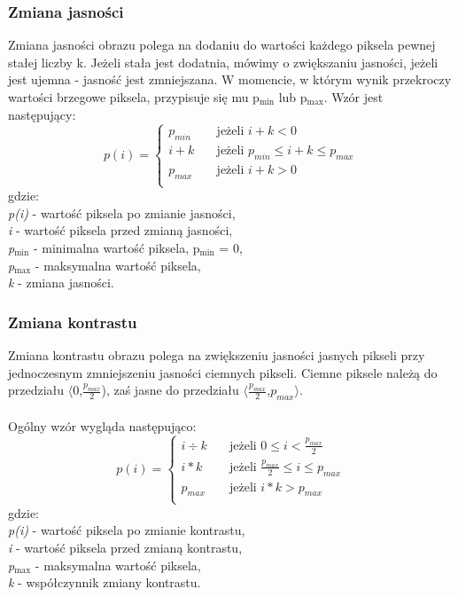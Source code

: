 \documentclass{classrep}
\begin{document}
\subsubsection{Zmiana jasności}
Zmiana jasności obrazu polega na dodaniu do wartości każdego piksela pewnej stałej liczby k. Jeżeli stała jest dodatnia, mówimy o zwiększaniu jasności, jeżeli jest ujemna - jasność jest zmniejszana. W momencie, w którym wynik przekroczy wartości brzegowe piksela, przypisuje się mu p$_{\text{min}}$ lub p$_{\text{max}}$. Wzór jest następujący:
\[ p(i) =
  \begin{cases}
    p_{min} & \quad \text{jeżeli } i + k < 0\\
    i + k  & \quad \text{jeżeli } p_{min} \leq i+k \leq p_{max}\\
    p_{max}  & \quad \text{jeżeli } i + k > 0\\
  \end{cases}
\]
gdzie:\\
\textit{p(i)} - wartość piksela po zmianie jasności,\\
\textit{i} - wartość piksela przed zmianą jasności,\\
\textit{p$_{\text{min}}$} - minimalna wartość piksela, p$_{\text{min}}$ = 0,\\
\textit{p$_{\text{max}}$} - maksymalna wartość piksela,\\
\textit{k} - zmiana jasności.\\

\subsubsection{Zmiana kontrastu}
Zmiana kontrastu obrazu polega na zwiększeniu jasności jasnych pikseli przy jednoczesnym zmniejszeniu jasności ciemnych pikseli. Ciemne piksele należą do przedziału $\langle$0,$ \frac{p_{max}}{2}$), zaś jasne do przedziału $\langle$$ \frac{p_{max}}{2}$,$p_{max}$$\rangle$.\\
\\
Ogólny wzór wygląda następująco:
\[ p(i) =
  \begin{cases}
    i \div k  & \quad \text{jeżeli } 0 \leq i < \frac{p_{max}}{2}\\
    i \ast k  & \quad \text{jeżeli } \frac{p_{max}}{2} \leq i \leq p_{max}\\
    p_{max}  & \quad \text{jeżeli } i \ast k > p_{max}\\
  \end{cases}
\]
gdzie:\\
\textit{p(i)} - wartość piksela po zmianie kontrastu,\\
\textit{i} - wartość piksela przed zmianą kontrastu,\\
\textit{p$_{\text{max}}$} - maksymalna wartość piksela,\\
\textit{k} - współczynnik zmiany kontrastu.\\
\end{document}
